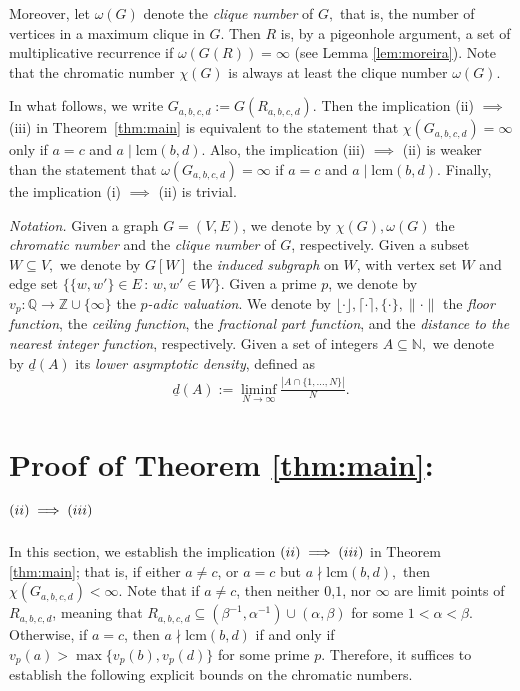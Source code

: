 \documentclass[12pt, reqno, a4paper]{amsart}
\theoremstyle{definition}
\theoremstyle{remark}
\numberwithin{equation}{section}
\begin{document}
Moreover, let $\omega(G)$ denote the \textit{clique number} of $G,$ that is, the number of vertices in a maximum clique in $G.$ Then \( R \) is, by a pigeonhole argument, a set of multiplicative recurrence if  \( \omega(G(R)) = \infty \) (see Lemma \ref{lem:moreira}). Note that the chromatic number $\chi(G) $ is always at least the clique number $\omega(G).$

In what follows, we write \( G_{a,b,c,d} := G(R_{a,b,c,d}) \). 
Then the implication \textnormal{(ii)} $\implies$ \textnormal{(iii)} in Theorem~\ref{thm:main} is equivalent to the statement that \( \chi(G_{a,b,c,d}) = \infty \) only if \( a = c \) and \( a \mid \mathrm{lcm}(b, d) \). Also, the implication \textnormal{(iii)} $\implies$ \textnormal{(ii)} is weaker than the statement that \( \omega(G_{a,b,c,d}) = \infty \) if \( a = c \) and \( a \mid \mathrm{lcm}(b, d) \). Finally, the implication \textnormal{(i)} $\implies$ \textnormal{(ii)} is trivial.



\medskip
\noindent\textit{Notation.} 
 Given a graph $G=(V,E)$, we denote by $\chi(G), \omega(G)$ the \textit{chromatic number} and the \textit{clique number} of $G$, respectively. Given a subset $W \subseteq V,$ we denote by $G[W]$ the \textit{induced subgraph} on $W$, with vertex set $W$ and edge set $\{ \{ w, w'\} \in E \,:\, w,w' \in W \}$. Given a prime \( p \), we denote by \( v_p : \mathbb{Q} \to \mathbb{Z} \cup \{\infty\} \) the \textit{\( p \)-adic valuation}. We denote by $\lfloor \cdot  \rfloor, \lceil \cdot  \rceil, \{ \cdot\}, \| \cdot \|$ the \textit{floor function}, the \textit{ceiling function}, the \textit{fractional part function}, and the \textit{distance to the nearest integer function}, respectively. Given a set of integers $A \subseteq \mathbb{N},$ we denote by $\underline{d}(A)$ its \textit{lower asymptotic density}, defined as
\begin{align*}
\underline{d}(A):=\liminf_{N \to \infty} \frac{|A \cap \{ 1, \ldots, N\}|}{ N}.
\end{align*}



\section{Proof of Theorem \ref{thm:main}: $\textnormal{(ii)} \implies \textnormal{(iii)}$}
  In this section, we establish the implication $\textnormal{(ii)} \implies \textnormal{(iii)}$ in Theorem \ref{thm:main}; that is, if either $a \neq c$, or $a=c$ but $a \nmid \mathrm{lcm}(b,d),$ then $\chi(G_{a,b,c,d})<\infty.$ Note that if $a\neq c$, then neither $0$,$1$, nor $\infty$ are limit points of $R_{a,b,c,d}$, meaning that $R_{a,b,c,d} \subseteq (\beta^{-1},\alpha^{-1})\cup(\alpha,\beta)$ for some $1<\alpha<\beta.$ Otherwise, if $a=c$, then $a \nmid \mathrm{lcm}(b,d)$ if and only if $v_p(a)>\max\{v_p(b),v_p(d)\}$ for some prime $p.$ Therefore, it suffices to establish the following explicit bounds on the chromatic numbers.
\end{document}
